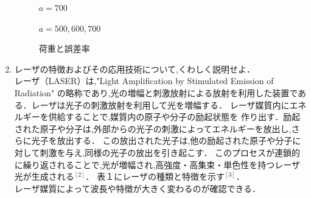 \documentclass[a4paper,11pt]{jsarticle}
\begin{document}
\begin{enumerate}
\begin{figure}[h]
  \caption{$a = 700$}
\end{figure}
\clearpage
\begin{figure}[h]
  \centering
  \caption{$a = 500,600,700$}
\end{figure}
\clearpage
\begin{figure}[h]
  \centering
  \caption{荷重と誤差率}
\end{figure}
\clearpage
\item レーザの特徴およびその応用技術について,くわしく説明せよ．\\
\quad レーザ（LASER）は,"Light Amplification by Stimulated Emission of Radiation" 
の略称であり,光の増幅と刺激放射による放射を利用した装置である．レーザは光子の刺激放射を利用して光を増幅する．
レーザ媒質内にエネルギーを供給することで,媒質内の原子や分子の励起状態を
作り出す．励起された原子や分子は,外部からの光子の刺激によってエネルギーを放出し,さらに光子を放出する．
この放出された光子は,他の励起された原子や分子に対して刺激を与え,同様の光子の放出を引き起こす．
このプロセスが連鎖的に繰り返されることで,光が増幅され,高強度・高集束・単色性を持つレーザ光が生成される$^{[2]}$．
表１にレーザの種類と特徴を示す$^{[3]}$．\\レーザ媒質によって波長や特徴が大きく変わるのが確認できる．



\end{enumerate}
\end{document}

